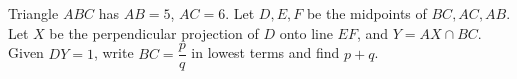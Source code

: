Triangle $ABC$ has $AB=5$, $AC=6$. Let $D,E,F$ be the midpoints of $BC,AC,AB$. Let $X$ be the perpendicular projection of $D$ onto line $EF$, and $Y=AX\cap BC$. Given $DY=1$, write $BC=\dfrac{p}{q}$ in lowest terms and find $p+q$.
